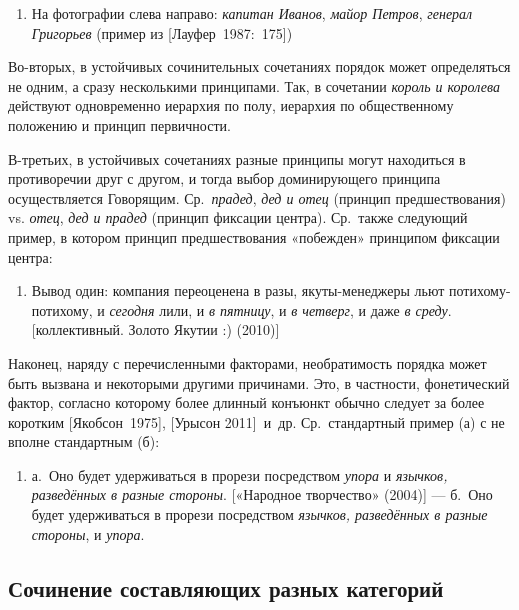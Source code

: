 \begin{enumerate}
\def\labelenumi{(\arabic{enumi})}
\setcounter{enumi}{27}
\item
  На фотографии слева направо: \textit{капитан Иванов}, \textit{майор
  Петров}, \textit{генерал Григорьев} (пример из {[}Лауфер~1987:~175{]})
\end{enumerate}

Во-вторых, в устойчивых сочинительных сочетаниях порядок может
определяться не одним, а сразу несколькими принципами. Так, в сочетании
\textit{король и королева} действуют одновременно иерархия по полу,
иерархия по общественному положению и принцип первичности.

В-третьих, в устойчивых сочетаниях разные принципы могут находиться в
противоречии друг с другом, и тогда выбор доминирующего принципа
осуществляется Говорящим. Ср.~\textit{прадед}, \textit{дед и отец} (принцип
предшествования) vs. \textit{отец}, \textit{дед и прадед} (принцип фиксации
центра). Ср.~также следующий пример, в котором принцип предшествования
«побежден» принципом фиксации центра:

\begin{enumerate}
\def\labelenumi{(\arabic{enumi})}
\setcounter{enumi}{28}
\item
  Вывод один: компания переоценена в разы, якуты-менеджеры льют
  потихому-потихому, и \textit{сегодня} лили, и \textit{в пятницу}, и
  \textit{в четверг}, и даже \textit{в среду}. {[}коллективный. Золото
  Якутии :) (2010){]}
\end{enumerate}

Наконец, наряду с перечисленными факторами, необратимость порядка может
быть вызвана и некоторыми другими причинами. Это, в частности,
фонетический фактор, согласно которому более длинный конъюнкт обычно
следует за более коротким {[}Якобсон~1975{]}, {[}Урысон 2011{]}~и~др.
Ср.~стандартный пример (а) с не вполне стандартным (б):

\begin{enumerate}
\def\labelenumi{(\arabic{enumi})}
\setcounter{enumi}{29}
\item
  а.~Оно будет удерживаться в прорези посредством \textit{упора} и
  \textit{язычков, разведённых в разные стороны}. {[}«Народное творчество»
  (2004){]} --- б.~Оно будет удерживаться в прорези посредством
  \textit{язычков, разведённых в разные стороны}, и \textit{упора}.
\end{enumerate}

\subsection{Сочинение составляющих разных
категорий}\label{ux441ux43eux447ux438ux43dux435ux43dux438ux435-ux441ux43eux441ux442ux430ux432ux43bux44fux44eux449ux438ux445-ux440ux430ux437ux43dux44bux445-ux43aux430ux442ux435ux433ux43eux440ux438ux439}

